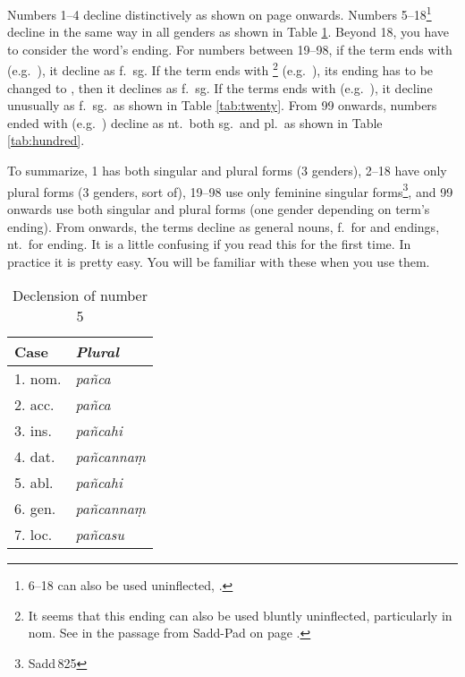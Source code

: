 Numbers 1--4 decline distinctively as shown on page \pageref{decl:one} onwards. Numbers 5--18\footnote{6--18 can also be used uninflected, \citealp[see][p.~71]{collins:grammar}.} decline in the same way in all genders as shown in Table \ref{tab:five}. Beyond 18, you have to consider the word's ending. For numbers between 19--98, if the term ends with  (e.g.\ ), it decline as f.\ sg. If the term ends with \footnote{It seems that this ending can also be used bluntly uninflected, particularly in nom. See  in the passage from Sadd-Pad on page \pageref{par:sabbanamani}.} (e.g.\ ), its ending has to be changed to , then it declines as f.\ sg. If the terms ends with  (e.g.\ ), it decline unusually as f.\ sg.\ as shown in Table \ref{tab:twenty}. From 99 onwards, numbers ended with  (e.g.\ ) decline as nt.\ both sg.\ and pl.\ as shown in Table \ref{tab:hundred}.

To summarize, 1 has both singular and plural forms (3 genders), 2--18 have only plural forms (3 genders, sort of), 19--98 use only feminine singular forms\footnote{Sadd\,825}, and 99 onwards use both singular and plural forms (one gender depending on term's ending). From  onwards, the terms decline as general nouns, f.\ for  and  endings, nt.\ for  ending. It is a little confusing if you read this for the first time. In practice it is pretty easy. You will be familiar with these when you use them.

\begin{table}[!hbt]
\centering
\caption{Declension of number 5}
\label{tab:five}
\bigskip
\begin{tabular}{l>{\itshape}l} \toprule
\bfseries Case & \upshape\bfseries Plural \\
\midrule
1. nom. & pa\~nca \\
2. acc. & pa\~nca \\
3. ins. & pa\~ncahi \\
4. dat. & pa\~ncanna\d m \\
5. abl. & pa\~ncahi \\
6. gen. & pa\~ncanna\d m \\
7. loc. & pa\~ncasu \\
\bottomrule
\end{tabular}
\end{table}

